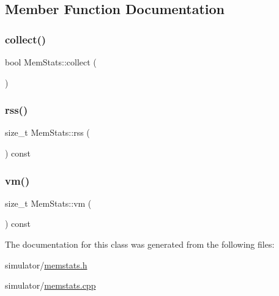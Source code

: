 \subsection{Member Function Documentation}
\mbox{\label{class_mem_stats_abfdee470694d64d99dc628e5d6ac7c4d}} 
\subsubsection{\texorpdfstring{collect()}{collect()}}
{\footnotesize\ttfamily bool Mem\+Stats\+::collect (\begin{DoxyParamCaption}{ }\end{DoxyParamCaption})}

\mbox{\label{class_mem_stats_af871da40df8d3810d331c4c550fd070b}} 
\subsubsection{\texorpdfstring{rss()}{rss()}}
{\footnotesize\ttfamily size\+\_\+t Mem\+Stats\+::rss (\begin{DoxyParamCaption}{ }\end{DoxyParamCaption}) const\hspace{0.3cm}{\ttfamily [inline]}}

\mbox{\label{class_mem_stats_a4b0ccd8c10a2c6c8090d168205142b26}} 
\subsubsection{\texorpdfstring{vm()}{vm()}}
{\footnotesize\ttfamily size\+\_\+t Mem\+Stats\+::vm (\begin{DoxyParamCaption}{ }\end{DoxyParamCaption}) const\hspace{0.3cm}{\ttfamily [inline]}}



The documentation for this class was generated from the following files\+:\begin{DoxyCompactItemize}
\item 
simulator/\mbox{\hyperlink{memstats_8h}{memstats.\+h}}\item 
simulator/\mbox{\hyperlink{memstats_8cpp}{memstats.\+cpp}}\end{DoxyCompactItemize}
